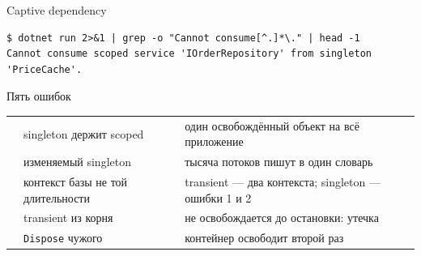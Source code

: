 \documentclass[aspectratio=169,10pt,t]{beamer}
\newcommand{\termsm}{\ttfamily\fontsize{6.6}{7.9}\selectfont}
\begin{document}
\begin{frame}[fragile]{Captive dependency}
  \slidetop
  \begin{center}
  \end{center}

\begin{lstlisting}[style=term,basicstyle=\termsm]
$ dotnet run 2>&1 | grep -o "Cannot consume[^.]*\." | head -1
Cannot consume scoped service 'IOrderRepository' from singleton 'PriceCache'.
\end{lstlisting}

\end{frame}

\begin{frame}{Пять ошибок}
  \slidetop
  {\renewcommand{\arraystretch}{1.45}
  \begin{tabular}{@{}L{0.5cm}L{5.3cm}L{7.0cm}@{}}
     & singleton держит scoped        & один освобождённый объект на всё
      приложение \\
     & изменяемый singleton           & тысяча потоков пишут в один
      словарь \\
     & контекст базы не той длительности & transient --- два
      контекста; singleton --- ошибки 1 и 2 \\
     & transient из корня             & не освобождается до
      остановки: утечка \\
     & \texttt{Dispose} чужого        & контейнер освободит второй
      раз \\
  \end{tabular}}

  \slidegap
\end{frame}
\end{document}
